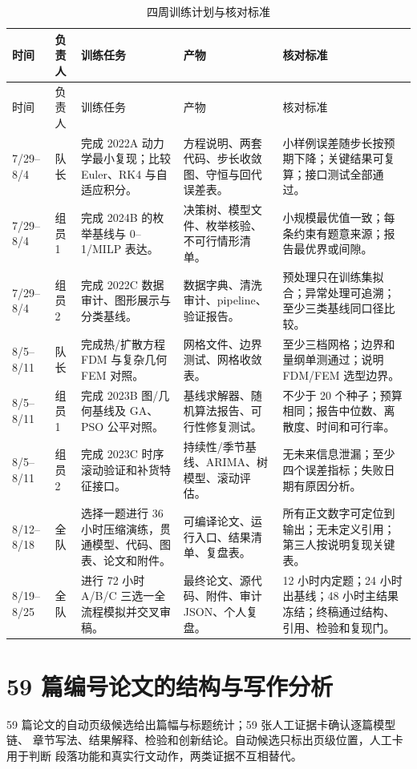\documentclass[UTF8,a4paper,12pt]{ctexart}
\begin{document}
\begin{longtable}{p{1.4cm}p{1.55cm}p{3.1cm}p{4.6cm}p{3.4cm}}
\caption{四周训练计划与核对标准}\label{tab:four-weeks}\\
\toprule
时间 & 负责人 & 训练任务 & 产物 & 核对标准\\
\midrule
\endfirsthead
\toprule
时间 & 负责人 & 训练任务 & 产物 & 核对标准\\
\midrule
\endhead
7/29--8/4 & 队长 & 完成 2022A 动力学最小复现；比较 Euler、RK4 与自适应积分。 & 方程说明、两套代码、步长收敛图、守恒与回代误差表。 & 小样例误差随步长按预期下降；关键结果可复算；接口测试全部通过。\\
7/29--8/4 & 组员1 & 完成 2024B 的枚举基线与 0--1/MILP 表达。 & 决策树、模型文件、枚举核验、不可行情形清单。 & 小规模最优值一致；每条约束有题意来源；报告最优界或间隙。\\
7/29--8/4 & 组员2 & 完成 2022C 数据审计、图形展示与分类基线。 & 数据字典、清洗审计、pipeline、验证报告。 & 预处理只在训练集拟合；异常处理可追溯；至少三类基线同口径比较。\\
8/5--8/11 & 队长 & 完成热/扩散方程 FDM 与复杂几何 FEM 对照。 & 网格文件、边界测试、网格收敛表。 & 至少三档网格；边界和量纲单测通过；说明 FDM/FEM 选型边界。\\
8/5--8/11 & 组员1 & 完成 2023B 图/几何基线及 GA、PSO 公平对照。 & 基线求解器、随机算法报告、可行性修复测试。 & 不少于 20 个种子；预算相同；报告中位数、离散度、时间和可行率。\\
8/5--8/11 & 组员2 & 完成 2023C 时序滚动验证和补货特征接口。 & 持续性/季节基线、ARIMA、树模型、滚动评估。 & 无未来信息泄漏；至少四个误差指标；失败日期有原因分析。\\
8/12--8/18 & 全队 & 选择一题进行 36 小时压缩演练，贯通模型、代码、图表、论文和附件。 & 可编译论文、运行入口、结果清单、复盘表。 & 所有正文数字可定位到输出；无未定义引用；第三人按说明复现关键表。\\
8/19--8/25 & 全队 & 进行 72 小时 A/B/C 三选一全流程模拟并交叉审稿。 & 最终论文、源代码、附件、审计 JSON、个人复盘。 & 12 小时内定题；24 小时出基线；48 小时主结果冻结；终稿通过结构、引用、检验和复现门。\\
\bottomrule
\end{longtable}

\section{59 篇编号论文的结构与写作分析}

59 篇论文的自动页级候选给出篇幅与标题统计；59 张人工证据卡确认逐篇模型链、
章节写法、结果解释、检验和创新结论。自动候选只标出页级位置，人工卡用于判断
段落功能和真实行文动作，两类证据不互相替代。
\end{document}
